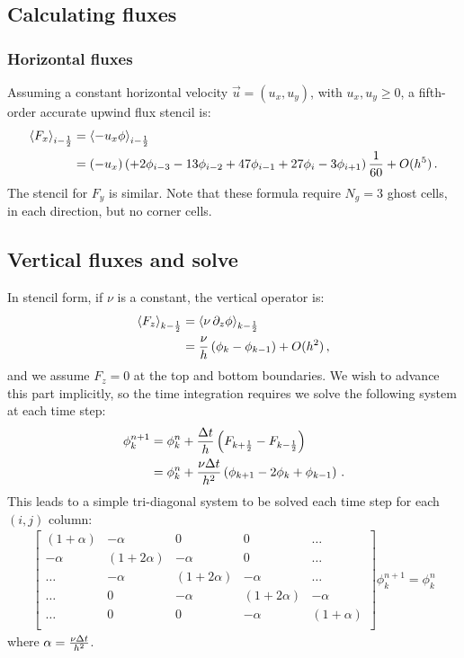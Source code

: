 \documentclass[11pt]{article}
\begin{document}
\subsection{Calculating fluxes}

\subsubsection{Horizontal fluxes}
Assuming a constant horizontal velocity $\vec{u} = (u_x, u_y)$,
  with $u_x, u_y \ge 0$,
  a fifth-order accurate upwind flux stencil is:
\begin{align}
  \nonumber
  \left\langle F_x \right\rangle_{i - {\frac{1}{2}}} & = \left\langle -u_x \phi \right\rangle_{i - {\frac{1}{2}}} \\
  & = (-u_x) 
  \left( 
    +2 \phi_{i - 3}
    -13 \phi_{i - 2}
    +47 \phi_{i - 1}
    +27 \phi_{i}
    -3 \phi_{i + 1}
  \right)
  \frac{1}{60}
  + O(h^5) \, .
\end{align}
The stencil for $F_y$ is similar. Note that these formula require
  $N_g = 3$ ghost cells, in each direction, but no corner cells.

\subsection{Vertical fluxes and solve}
In stencil form, if $\nu$ is a constant, the vertical operator is:
\begin{align}
  \left\langle F_z \right\rangle_{k - {\frac{1}{2}}} & = \left\langle \nu \, \partial_z \phi \right\rangle_{k - {\frac{1}{2}}} \\ 
   & = \frac{\nu}{h} \left( \phi_{k} - \phi_{k-1} \right) + O(h^2) \, ,
\end{align}
  and we assume $F_z = 0$ at the top and bottom boundaries.
We wish to advance this part implicitly, so the time integration 
  requires we solve the following system at each time step:
\begin{align}
 \phi^{n+1}_k & = 
    \phi^n_k + \frac{{\Delta t}}{h} \left(F_{k+{\frac{1}{2}}} - F_{k-{\frac{1}{2}}} \right) 
\\
 & = \phi^n_k +
    \frac{\nu {\Delta t}}{h^2} \left(\phi_{k+1}-2\phi_{k}+\phi_{k-1}\right) \, .
\end{align}
This leads to a simple tri-diagonal system to be solved each time step
  for each $(i,j)$ column:
\begin{align}
\label{eqn:vertsolve}
  \begin{bmatrix}
    (1 + \alpha) & -\alpha & 0 & 0 & \dots  \\
    -\alpha & (1 + 2 \alpha) & -\alpha & 0 & \dots  \\
    \dots & -\alpha & (1 + 2 \alpha) & -\alpha & \dots  \\
    \dots & 0 & -\alpha & (1 + 2 \alpha) & -\alpha \\
    \dots & 0 &  0 & -\alpha & (1 + \alpha) \\
  \end{bmatrix}
  \phi^{n+1}_k = \phi^n_k
\end{align}
  where $\alpha = \frac{\nu {\Delta t}}{h^2}$.
\end{document}
